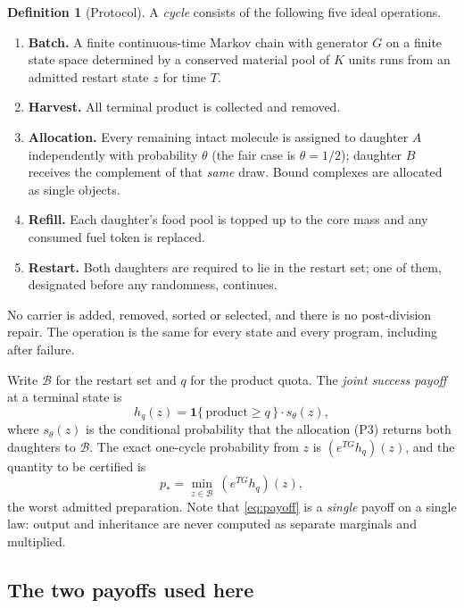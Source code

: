 \documentclass[11pt]{article}
\theoremstyle{plain}
\theoremstyle{definition}
\newtheorem{definition}[theorem]{Definition}
\theoremstyle{remark}
\newcommand{\one}{\mathbf{1}}
\begin{document}
\begin{definition}[Protocol]\label{def:protocol}
A \emph{cycle} consists of the following five ideal operations.
\begin{enumerate}\itemsep1pt
\item[(P1)] \textbf{Batch.} A finite continuous-time Markov chain with
generator $G$ on a finite state space determined by a conserved material pool
of $K$ units runs from an admitted restart state $z$ for time $T$.
\item[(P2)] \textbf{Harvest.} All terminal product is collected and removed.
\item[(P3)] \textbf{Allocation.} Every remaining intact molecule is assigned
to daughter $A$ independently with probability $\theta$ (the fair case is
$\theta=1/2$); daughter $B$ receives the complement of that \emph{same} draw.
Bound complexes are allocated as single objects.
\item[(P4)] \textbf{Refill.} Each daughter's food pool is topped up to the
core mass and any consumed fuel token is replaced.
\item[(P5)] \textbf{Restart.} Both daughters are required to lie in the
restart set; one of them, designated before any randomness, continues.
\end{enumerate}
No carrier is added, removed, sorted or selected, and there is no
post-division repair. The operation is the same for every state and every
program, including after failure.
\end{definition}

Write $\mathcal{B}$ for the restart set and $q$ for the product quota. The
\emph{joint success payoff} at a terminal state is
\begin{equation}\label{eq:payoff}
h_q(z)=\one\{\,\text{product}\ge q\,\}\cdot s_\theta(z),
\end{equation}
where $s_\theta(z)$ is the conditional probability that the allocation (P3)
returns both daughters to $\mathcal{B}$. The exact one-cycle probability from
$z$ is $(e^{TG}h_q)(z)$, and the quantity to be certified is
\begin{equation}\label{eq:pstar}
p_*=\min_{z\in\mathcal{B}}\ (e^{TG}h_q)(z),
\end{equation}
the worst admitted preparation. Note that \eqref{eq:payoff} is a
\emph{single} payoff on a single law: output and inheritance are never
computed as separate marginals and multiplied.

\subsection{The two payoffs used here}
\end{document}
